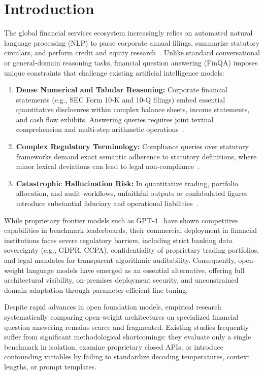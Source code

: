 \documentclass[11pt]{article}
\begin{document}
\section{Introduction}
\label{sec:intro}
The global financial services ecosystem increasingly relies on automated natural language processing (NLP) to parse corporate annual filings, summarize statutory circulars, and perform credit and equity research~\citep{shah2022flue}. Unlike standard conversational or general-domain reasoning tasks, financial question answering (FinQA) imposes unique constraints that challenge existing artificial intelligence models:
\begin{enumerate}
    \item \textbf{Dense Numerical and Tabular Reasoning:} Corporate financial statements (e.g., SEC Form 10-K and 10-Q filings) embed essential quantitative disclosures within complex balance sheets, income statements, and cash flow exhibits. Answering queries requires joint textual comprehension and multi-step arithmetic operations~\citep{chen2021finqa}.
    \item \textbf{Complex Regulatory Terminology:} Compliance queries over statutory frameworks demand exact semantic adherence to statutory definitions, where minor lexical deviations can lead to legal non-compliance~\citep{chen2024fintextqa}.
    \item \textbf{Catastrophic Hallucination Risk:} In quantitative trading, portfolio allocation, and audit workflows, unfaithful outputs or confabulated figures introduce substantial fiduciary and operational liabilities~\citep{islam2023financebench}.
\end{enumerate}

While proprietary frontier models such as GPT-4~\citep{brown2020language} have shown competitive capabilities in benchmark leaderboards, their commercial deployment in financial institutions faces severe regulatory barriers, including strict banking data sovereignty (e.g., GDPR, CCPA), confidentiality of proprietary trading portfolios, and legal mandates for transparent algorithmic auditability. Consequently, open-weight language models have emerged as an essential alternative, offering full architectural visibility, on-premises deployment security, and unconstrained domain adaptation through parameter-efficient fine-tuning.

Despite rapid advances in open foundation models, empirical research systematically comparing open-weight architectures on specialized financial question answering remains scarce and fragmented. Existing studies frequently suffer from significant methodological shortcomings: they evaluate only a single benchmark in isolation, examine proprietary closed APIs, or introduce confounding variables by failing to standardize decoding temperatures, context lengths, or prompt templates.
\end{document}
